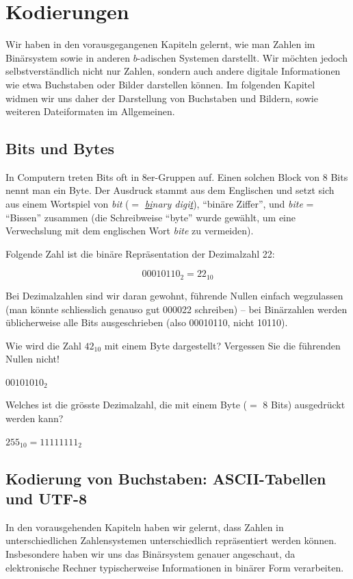 \chapter{Kodierungen}

Wir haben in den vorausgegangenen Kapiteln gelernt, wie man Zahlen im Binärsystem sowie in anderen $b$-adischen Systemen darstellt. Wir möchten jedoch selbstverständlich nicht nur Zahlen, sondern auch andere digitale Informationen wie etwa Buchstaben oder Bilder darstellen können. Im folgenden Kapitel widmen wir uns daher der Darstellung von Buchstaben und Bildern, sowie weiteren Dateiformaten im Allgemeinen.

\section{Bits und Bytes}
In Computern treten Bits oft in 8er-Gruppen auf. Einen solchen Block von 8 Bits nennt man ein Byte. Der Ausdruck stammt aus dem Englischen und setzt sich aus einem Wortspiel von \textit{bit} ($=$ \textit{\underline{bi}nary digi\underline{t}}), \enquote{binäre Ziffer}, und \textit{bite} = \enquote{Bissen} zusammen (die Schreibweise \enquote{byte} wurde gewählt, um eine Verwechslung mit dem englischen Wort \textit{bite} zu vermeiden).

Folgende Zahl ist die binäre Repräsentation der Dezimalzahl 22:

\[00010110_2 = 22_{10}\]

Bei Dezimalzahlen sind wir daran gewohnt, führende Nullen einfach wegzulassen (man könnte schliesslich genauso gut 000022 schreiben) -- bei Binärzahlen werden üblicherweise alle Bits ausgeschrieben (also 00010110, nicht 10110).

\begin{myexercise}
	Wie wird die Zahl $42_{10}$ mit einem Byte dargestellt? Vergessen Sie die führenden Nullen nicht!
	\begin{myanswer}
		$00101010_2$
	\end{myanswer}
\end{myexercise}

\begin{myexercise}
	\label{ex:byte-max}
	Welches ist die grösste Dezimalzahl, die mit einem Byte ($=$ 8 Bits) ausgedrückt werden kann?
	\begin{myanswer}
		$255_{10} = 11111111_2$
	\end{myanswer}
\end{myexercise}

\section{Kodierung von Buchstaben: ASCII-Tabellen und UTF-8}
In den vorausgehenden Kapiteln haben wir gelernt, dass Zahlen in unterschiedlichen Zahlensystemen unterschiedlich repräsentiert werden können. Insbesondere haben wir uns das Binärsystem genauer angeschaut, da elektronische Rechner typischerweise Informationen in binärer Form verarbeiten.


